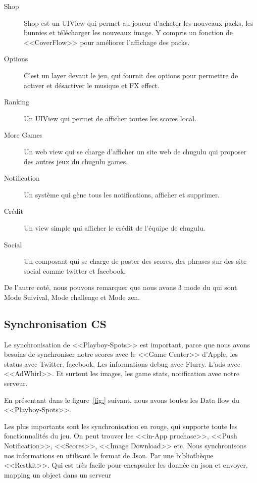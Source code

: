 \begin{description}
	\item[Shop] Shop est un UIView qui permet au joueur d'acheter les nouveaux packs, les bunnies et télécharger les nouveaux image. Y compris un fonction de <<CoverFlow>> pour améliorer l'affichage des packs.
	\item[Options] C'est un layer devant le jeu, qui fournit des options pour permettre de activer et désactiver le musique et FX effect.
	\item[Ranking] Un UIView qui permet de afficher toutes les scores local.
	\item[More Games] Un web view qui se charge d'afficher un site web de chugulu qui proposer des autres jeux du chugulu games.
	\item[Notification] Un système qui gène tous les notifications, afficher et supprimer.
	\item[Crédit] Un view simple qui afficher le crédit de l'équipe de chugulu.
	\item[Social] Un composant qui se charge de poster des scores, des phrases sur des site social comme twitter et facebook.
\end{description}


De l'autre coté, nous pouvons remarquer que nous avons 3 mode du qui sont Mode Suivival, Mode challenge et Mode zen.



\subsection{Synchronisation CS} %

Le synchronisation de <<Playboy-Spots>> est important, parce que nous avons besoins de synchroniser notre scores avec le <<Game Center>> d'Apple, les status avec Twitter, facebook. Les informations debug avec Flurry. L'ads avec <<AdWhirl>>. Et surtout les images, les game stats, notification avec notre serveur.

En présentant dans le figure~\ref{fig:} suivant, nous avons toutes les Data flow du <<Playboy-Spots>>.

Les plus importants sont les synchronisation en rouge, qui supporte toute les fonctionnalités du jeu. On peut trouver les <<in-App pruchase>>, <<Push Notification>>, <<Scores>>, <<Image Download>> etc.
Nous synchronisons nos informations en utilisant le format de Json. Par une bibliothèque <<Restkit>>. Qui est très facile pour encapsuler les donnée en json et envoyer, mapping un object dans un serveur  

